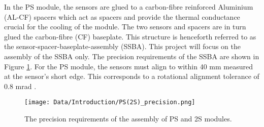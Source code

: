 In the PS module, the sensors are glued to a carbon-fibre reinforced Aluminium (AL-CF) spacers which act as spacers and provide the thermal conductance crucial for the cooling of the module. The two sensors and spacers are in turn glued the carbon-fibre (CF) baseplate. This structure is henceforth referred to as the sensor-spacer-baseplate-assembly (SSBA). This project will focus on the assembly of the SSBA only. The precision requirements of the SSBA are shown in Figure \ref{fig:ps(2s)_precision}. For the PS module, the sensors must align to within 40 mm measured at the sensor’s short edge. This corresponds to a rotational alignment tolerance of 0.8 mrad \cite{AutomatedAssembly_tutorial}.

\begin{figure}[ht]\centering
\texttt{[image: Data/Introduction/PS(2S)\_precision.png]}
\caption{The precision requirements of the assembly of PS
and 2S modules.}
\label{fig:ps(2s)_precision}
\end{figure}
